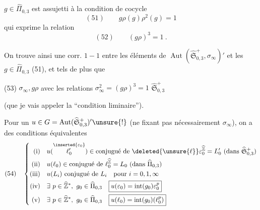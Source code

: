 
$g\in\widehat{\Pi}_{0,3}$  est assujetti à la condition de cocycle
\[
(51)\qquad \boxed{g\rho(g)\rho^2(g)=1}
\]
qui exprime la relation
\[
(52)\qquad (g\rho)^3=1\ .
\]

On trouve ainsi une corr. $1-1$ entre les éléments de $\operatorname{Aut}(\widehat{\mathfrak S}_{0,3}^{+},\sigma_\infty)'$ et les $g\in\widehat{\Pi}_{0,3}$  (51), et tels de plus que

(53) $\sigma_\infty,g\rho$ avec les relations $\sigma_\infty^2=(g\rho)^3=1$  $\widehat{\mathfrak S}_{0,3}^{+}$


(que je vais appeler la ``condition liminaire'').


Pour un $u\in G=\operatorname{Aut}(\widehat{\mathfrak S}_{0,3}^{+})'\unsure{!}$ (ne fixant pas nécessairement $\sigma_\infty$), on a des conditions équivalentes
\[
(54)\quad
\left\{\begin{aligned}
\text{(i)}\quad &u(\overset{\inserted{\varepsilon_0}}{\ell'_0})\in\text{conjugué de }\deleted{\unsure{\ell}}\varepsilon_0^{\widehat{\mathbb Z}}=L'_0\ (\text{dans }\widehat{\mathfrak S}_{0,3}^{+})\\
\text{(ii)}\quad &u(\ell_0)\in\text{conjugué de }\ell_0^{\widehat{\mathbb Z}}=L_0\ (\text{dans }\widehat{\Pi}_{0,3})\\
\text{(iii)}\quad &u(L_i)\text{ conjugué de }L_i\quad\text{pour }i=0,1,\infty\\
\text{(iv)}\quad &\exists\ p\in\widehat{\mathbb Z}^{\ast},\ g_0\in\widehat{\Pi}_{0,3}\quad
\boxed{u(\varepsilon_0)=\operatorname{int}(g_0)\varepsilon_0^p}\\
\text{(v)}\quad &\exists\ p\in\widehat{\mathbb Z}^{\ast},\ g_0\in\widehat{\Pi}_{0,3}\quad
\boxed{u(\ell_0)=\operatorname{int}(g_0)(\ell_0^p)}
\end{aligned}\right.
\]

